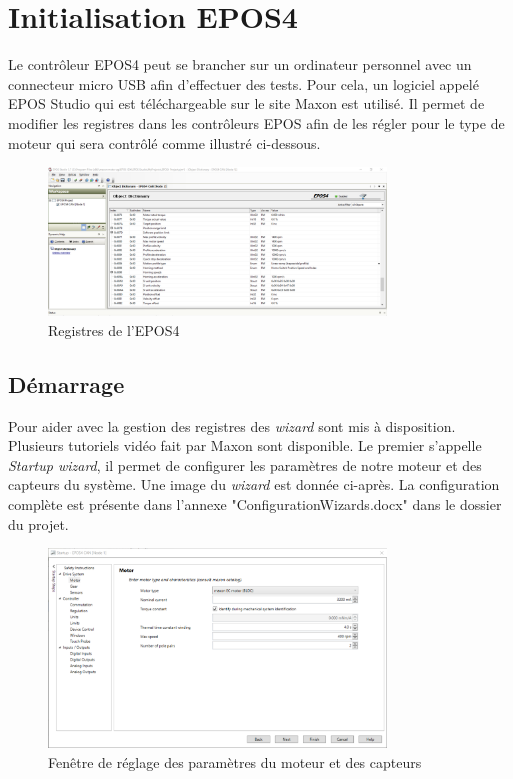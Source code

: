 \section{Initialisation EPOS4}\label{sec:InitEPOS4}
Le contrôleur EPOS4 peut se brancher sur un ordinateur personnel avec un connecteur micro USB afin d'effectuer des tests. Pour cela, un logiciel
appelé EPOS Studio qui est téléchargeable sur le site Maxon\cite{Maxon} est utilisé. Il permet de modifier les registres dans les contrôleurs EPOS
afin de les régler pour le type de moteur qui sera contrôlé comme illustré ci-dessous.

\begin{figure}[H]
    \centering
    \includegraphics[width = 0.8\textwidth]{assets/figures/Registres.png}
    \caption{Registres de l'EPOS4}
    \label{fig:Registres}
\end{figure}

\subsection{Démarrage}\label{subsec:Demarrage}
Pour aider avec la gestion des registres des \textit{\gls{wizard}} sont mis à disposition. Plusieurs tutoriels vidéo fait par Maxon \cite{TutoMaxon}
sont disponible. Le premier s'appelle \textit{Startup wizard}, il permet de configurer les paramètres de notre moteur et des capteurs du système.
Une image du \textit{\gls{wizard}} est donnée ci-après. La configuration complète est présente dans l'annexe "ConfigurationWizards.docx" dans le
dossier du projet.

\begin{figure}[H]
    \centering
    \includegraphics[width = 0.8\textwidth]{assets/figures/StartupWizard.png}
    \caption{Fenêtre de réglage des paramètres du moteur et des capteurs}
    \label{fig:StartWizard}
\end{figure}

